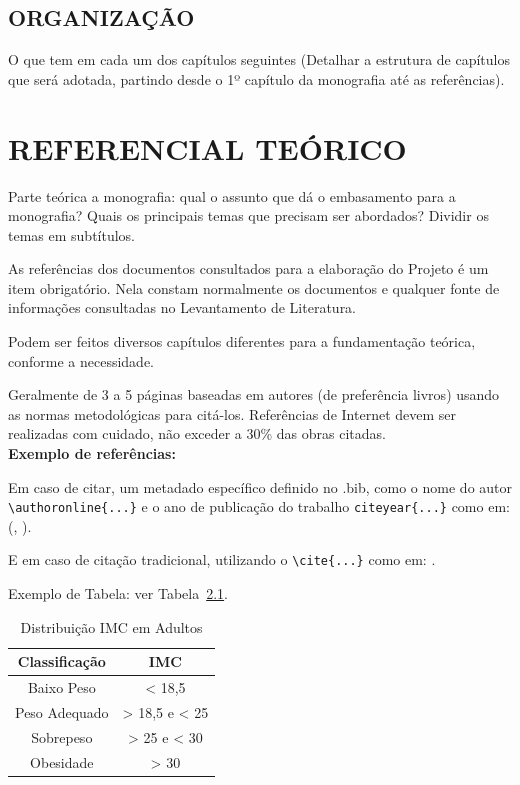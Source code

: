 \documentclass[
    12pt,				       %
    openright,			       %
    oneside,			       %
    a4paper,			       %
    chapter=TITLE,             %
    sumario=tradicional,       %
    english,			        %
    brazil, 				    %
 ]{abntex2}
\begin{document}
\section{\MakeUppercase{Organização}}\label{sec:Organizacao}
O que tem em cada um dos capítulos seguintes (Detalhar a estrutura de capítulos que será adotada, partindo desde o 1º capítulo da monografia até as referências).

\chapter{\MakeUppercase{Referencial Teórico}}\label{sec:RefTeorico}
Parte teórica a monografia: qual o assunto que dá o embasamento para a monografia? Quais os principais temas que precisam ser abordados? Dividir os temas em subtítulos.

As referências dos documentos consultados para a elaboração do Projeto é um item obrigatório. Nela constam normalmente os documentos e qualquer fonte de informações consultadas no Levantamento de Literatura.

Podem ser feitos diversos capítulos diferentes para a fundamentação teórica, conforme a necessidade.

Geralmente de 3 a 5 páginas baseadas em autores (de preferência livros) usando as normas metodológicas para citá-los. Referências de Internet devem ser realizadas com cuidado, não exceder a 30\% das obras citadas. \\

\textbf{Exemplo de referências:}

Em caso de citar, um metadado específico definido no .bib, como o nome do autor \verb|\authoronline{...}| e o ano de publicação do trabalho \verb|citeyear{...}| como em:
(, \citeyear{NBR14724:2011}).

E em caso de citação tradicional, utilizando o \verb|\cite{...}| como em:
\cite{NBR14724:2011}.

Exemplo de Tabela: ver Tabela~\ref{tab:exetab}.

\begin{table}[!ht]
    \begin{center}
        \caption{Distribuição IMC em Adultos}
        \label{tab:exetab}
        \begin{tabular}{| c | c |}
            \hline
            \textbf{\textbf{Classificação}} & \textbf{IMC}\\
            \hline\hline
            Baixo Peso & < 18,5 \\
            Peso Adequado & > 18,5 e < 25 \\
            Sobrepeso & > 25 e < 30 \\
            Obesidade & > 30 \\
            \hline
        \end{tabular}
    \end{center}
\end{table}
\end{document}
